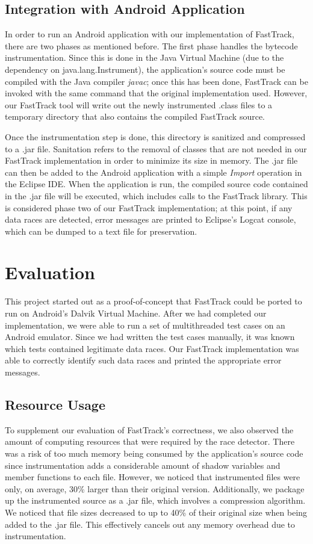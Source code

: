\documentclass{acm_proc_article-sp}
\begin{document}
\subsection{Integration with Android Application}
In order to run an Android application with our implementation of FastTrack, there are two phases as mentioned before. The first phase handles the bytecode instrumentation. Since this is done in the Java Virtual Machine (due to the dependency on java.lang.Instrument), the application's source code must be compiled with the Java compiler \emph{javac}; once this has been done, FastTrack can be invoked with the same command that the original implementation used. However, our FastTrack tool will write out the newly instrumented .class files to a temporary directory that also contains the compiled FastTrack source. 

Once the instrumentation step is done, this directory is sanitized and compressed to a .jar file.  Sanitation refers to the removal of classes that are not needed in our FastTrack implementation in order to minimize its size in memory. The .jar file can then be added to the Android application with a simple \emph{Import} operation in the Eclipse IDE. When the application is run, the compiled source code contained in the .jar file will be executed, which includes calls to the FastTrack library. This is considered phase two of our FastTrack implementation; at this point, if any data races are detected, error messages are printed to Eclipse's Logcat console, which can be dumped to a text file for preservation.


\section{Evaluation}
This project started out as a proof-of-concept that FastTrack could be ported to run on Android's Dalvik Virtual Machine. After we had completed our implementation, we were able to run a set of multithreaded test cases on an Android emulator. Since we had written the test cases manually, it was known which tests contained legitimate data races. Our FastTrack implementation was able to correctly identify such data races and printed the appropriate error messages. 

\subsection{Resource Usage}
To supplement our evaluation of FastTrack's correctness, we also observed the amount of computing resources that were required by the race detector. There was a risk of too much memory being consumed by the application's source code since instrumentation adds a considerable amount of shadow variables and member functions to each file. However, we noticed that instrumented files were only, on average, 30\% larger than their original version. Additionally, we package up the instrumented source as a .jar file, which involves a compression algorithm. We noticed that file sizes decreased to up to 40\% of their original size when being added to the .jar file. This effectively cancels out any memory overhead due to instrumentation.
\end{document}

